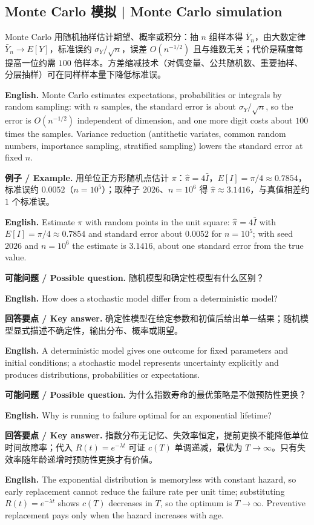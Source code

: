 \documentclass[UTF8,11pt,a4paper]{ctexart}
\newcommand{\EN}[1]{\par\noindent\textbf{English.} #1\par}
\newcommand{\EX}[2]{\par\noindent\textbf{例子 / Example.} #1\par\EN{#2}}
\newcommand{\ASK}[4]{\par\noindent\textbf{可能问题 / Possible question.} #1\par\EN{#2}\noindent\textbf{回答要点 / Key answer.} #3\par\EN{#4}\smallskip}
\begin{document}
\subsection{Monte Carlo 模拟 | Monte Carlo simulation}
Monte Carlo 用随机抽样估计期望、概率或积分：抽 $n$ 组样本得 $\bar Y_n$，由大数定律 $\bar Y_n\to E[Y]$，标准误约 $\sigma_Y/\sqrt n$，误差 $O(n^{-1/2})$ 且与维数无关；代价是精度每提高一位约需 $100$ 倍样本。方差缩减技术（对偶变量、公共随机数、重要抽样、分层抽样）可在同样样本量下降低标准误。
\EN{Monte Carlo estimates expectations, probabilities or integrals by random sampling: with $n$ samples, the standard error is about $\sigma_Y/\sqrt n$, so the error is $O(n^{-1/2})$ independent of dimension, and one more digit costs about $100$ times the samples. Variance reduction (antithetic variates, common random numbers, importance sampling, stratified sampling) lowers the standard error at fixed $n$.}
\EX{用单位正方形随机点估计 $\pi$：$\hat\pi=4\bar I$，$E[I]=\pi/4\approx0.7854$，标准误约 $0.0052$（$n=10^5$）；取种子 $2026$、$n=10^6$ 得 $\hat\pi\approx3.1416$，与真值相差约 $1$ 个标准误。}{Estimate $\pi$ with random points in the unit square: $\hat\pi=4\bar I$ with $E[I]=\pi/4\approx0.7854$ and standard error about $0.0052$ for $n=10^5$; with seed $2026$ and $n=10^6$ the estimate is $3.1416$, about one standard error from the true value.}
\ASK{随机模型和确定性模型有什么区别？}{How does a stochastic model differ from a deterministic model?}{确定性模型在给定参数和初值后给出单一结果；随机模型显式描述不确定性，输出分布、概率或期望。}{A deterministic model gives one outcome for fixed parameters and initial conditions; a stochastic model represents uncertainty explicitly and produces distributions, probabilities or expectations.}
\ASK{为什么指数寿命的最优策略是不做预防性更换？}{Why is running to failure optimal for an exponential lifetime?}{指数分布无记忆、失效率恒定，提前更换不能降低单位时间故障率；代入 $R(t)=e^{-\lambda t}$ 可证 $c(T)$ 单调递减，最优为 $T\to\infty$。只有失效率随年龄递增时预防性更换才有价值。}{The exponential distribution is memoryless with constant hazard, so early replacement cannot reduce the failure rate per unit time; substituting $R(t)=e^{-\lambda t}$ shows $c(T)$ decreases in $T$, so the optimum is $T\to\infty$. Preventive replacement pays only when the hazard increases with age.}
\end{document}
